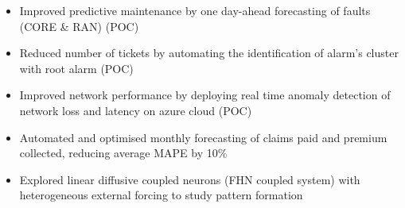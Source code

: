 \documentclass[10pt,a4paper,ragged2e,withhyper]{altacv}
\begin{document}
\begin{paracol}{2}
\par\divider
{}
\begin{itemize}
\item Improved predictive maintenance by one day-ahead forecasting of faults (CORE \& RAN) (POC)
\item Reduced number of tickets by automating the identification of alarm’s cluster with root alarm (POC)
\item Improved network performance by deploying real time anomaly detection of network loss and latency on azure cloud (POC)
\end{itemize}


\par\divider
{}
\begin{itemize}
\item Automated and optimised monthly forecasting of claims paid and premium collected, reducing average MAPE by 10\%
\end{itemize}

\par\divider


\begin{itemize}
\item Explored linear diffusive coupled neurons (FHN coupled system) with heterogeneous external forcing to study pattern formation
\end{itemize}


\newpage


\end{paracol}
\end{document}
